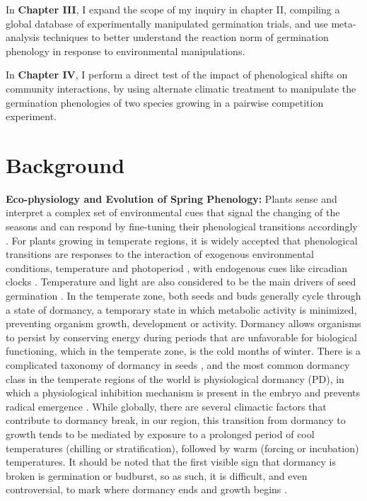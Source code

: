 \documentclass{article}\usepackage[]{graphicx}\usepackage[]{color}
\begin{document}
\par In \textbf{Chapter III}, I expand the scope of my inquiry in chapter II, compiling a global database of experimentally manipulated germination trials, and use meta-analysis techniques to better understand the reaction norm of germination phenology in response to environmental manipulations.
\par In \textbf{Chapter IV}, I perform a direct test of the impact of phenological shifts on community interactions, by using alternate climatic treatment to manipulate the germination phenologies of two species growing in a pairwise competition experiment.

\section*{Background}
\indent\indent\textbf{Eco-physiology and Evolution of Spring Phenology:} Plants sense and interpret a complex set of environmental cues that signal the changing of the seasons and can respond by fine-tuning their phenological transitions accordingly \citep{Vitasse2010}. For plants growing in temperate regions, it is widely accepted that phenological transitions are responses to the interaction of exogenous environmental conditions, temperature and photoperiod \citep{Forrest2010}, with endogenous cues like circadian clocks \citep{Visser2010}. Temperature and light are also considered to be the main drivers of seed germination \citep{Finch-Savage2006}. In the temperate zone, both seeds and buds generally cycle through a state of dormancy, a temporary state in which metabolic activity is minimized, preventing organism growth, development or activity. Dormancy allows organisms to persist by conserving energy during periods that are unfavorable for biological functioning, which in the temperate zone, is the cold months of winter. There is a complicated taxonomy of dormancy in seeds \citep{Baskin2004}, and the most common dormancy class in the temperate regions of the world is physiological dormancy (PD), in which a physiological inhibition mechanism is present in the embryo and prevents radical emergence \citep{Finch-Savage2006}. While globally, there are several climactic factors that contribute to dormancy break, in our region, this transition from dormancy to growth tends to be mediated by exposure to a prolonged period of cool temperatures (chilling or stratification), followed by warm (forcing or incubation) temperatures. It should be noted that the first visible sign that dormancy is broken is germination or budburst, so as such, it is difficult, and even controversial, to mark where dormancy ends and growth begins \citep{Long2015,Bewley1997}.
\end{document}
